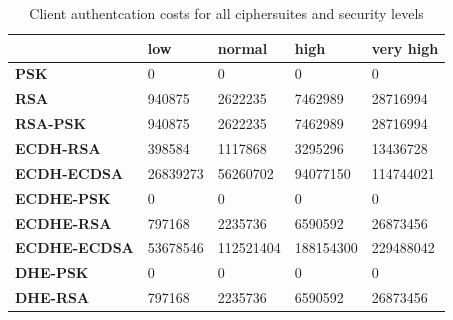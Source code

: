 \documentclass{llncs}
\begin{document}
\begin{table}[]
  \begin{tabular}{|l|l|l|l|l|}
  \hline
                       & \textbf{low} & \textbf{normal} & \textbf{high} & \textbf{very high} \\ \hline
  \textbf{PSK}         & 0            & 0               & 0             & 0                  \\ \hline
  \textbf{RSA}         & 940875       & 2622235         & 7462989       & 28716994           \\ \hline
  \textbf{RSA-PSK}     & 940875       & 2622235         & 7462989       & 28716994           \\ \hline
  \textbf{ECDH-RSA}    & 398584       & 1117868         & 3295296       & 13436728           \\ \hline
  \textbf{ECDH-ECDSA}  & 26839273     & 56260702        & 94077150      & 114744021          \\ \hline
  \textbf{ECDHE-PSK}   & 0            & 0               & 0             & 0                  \\ \hline
  \textbf{ECDHE-RSA}   & 797168       & 2235736         & 6590592       & 26873456           \\ \hline
  \textbf{ECDHE-ECDSA} & 53678546     & 112521404       & 188154300     & 229488042          \\ \hline
  \textbf{DHE-PSK}     & 0            & 0               & 0             & 0                  \\ \hline
  \textbf{DHE-RSA}     & 797168       & 2235736         & 6590592       & 26873456           \\ \hline
  \end{tabular}
  \caption{\label{table:tls-auth-cost-client} Client authentcation costs for all ciphersuites and security levels}
  \end{table}
\end{document}

